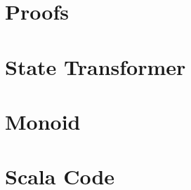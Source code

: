 \documentclass[10pt,a4paper]{article}
\begin{document}


\appendix
\pagebreak
\section{Proofs}


\pagebreak
\section{State Transformer}


\pagebreak
\section{Monoid}


\pagebreak
\section{Scala Code}


\clearpage

\end{document}
